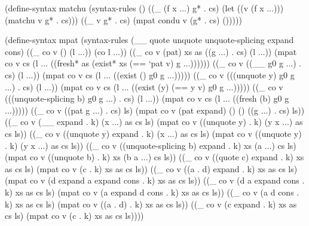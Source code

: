 \begin{schemedisplay}
(define-syntax matchu
  (syntax-rules ()
    ((_ (f x ...) g* . cs)
     (let ((v (f x ...))) (matchu v g* . cs)))
    ((_ v g* . cs) (mpat condu v (g* . cs) ()))))

(define-syntax mpat
  (syntax-rules (__ quote unquote unquote-splicing expand cons)
    ((_ co v () (l ...)) (co l ...))
    ((_ co v (pat) xs as ((g ...) . cs) (l ...))
     (mpat co v cs (l ... ((fresh* as (exist* xs (== `pat v) g ...))))))
    ((_ co v ((__ g0 g ...) . cs) (l ...))
     (mpat co v cs (l ... ((exist () g0 g ...)))))
    ((_ co v (((unquote y) g0 g ...) . cs) (l ...))
     (mpat co v cs (l ... ((exist (y) (== y v) g0 g ...)))))
    ((_ co v (((unquote-splicing b) g0 g ...) . cs) (l ...))
     (mpat co v cs (l ... ((fresh (b) g0 g ...)))))
    ((_ co v ((pat g ...) . cs) ls)
     (mpat co v (pat expand) () () ((g ...) . cs) ls))
    ((_ co v (__ expand . k) (x ...) as cs ls)
     (mpat co v ((unquote y) . k) (y x ...) as cs ls))
    ((_ co v ((unquote y) expand . k) (x ...) as cs ls)
     (mpat co v ((unquote y) . k) (y x ...) as cs ls))
    ((_ co v ((unquote-splicing b) expand . k) xs (a ...) cs ls)
     (mpat co v ((unquote b) . k) xs (b a ...) cs ls))
    ((_ co v ((quote c) expand . k) xs as cs ls)
     (mpat co v (c . k) xs as cs ls))
    ((_ co v ((a . d) expand . k) xs as cs ls)
     (mpat co v (d expand a expand cons . k) xs as cs ls))
    ((_ co v (d a expand cons . k) xs as cs ls)
     (mpat co v (a expand d cons . k) xs as cs ls))
    ((_ co v (a d cons . k) xs as cs ls)
     (mpat co v ((a . d) . k) xs as cs ls))
    ((_ co v (c expand . k) xs as cs ls)
     (mpat co v (c . k) xs as cs ls))))
\end{schemedisplay}
